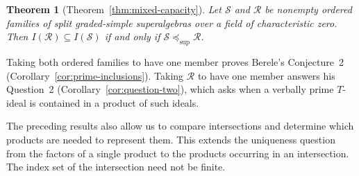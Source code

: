 \documentclass[11pt,reqno]{amsart}
\newtheorem{maintheorem}{Theorem}
\newcommand{\kk}{\Bbbk}
\newcommand{\E}{\mathcal E}
\newcommand{\Id}{\operatorname{Id}}
\newcommand{\Mat}{\operatorname{M}}
\newcommand{\Qtype}{\mathsf Q}
\theoremstyle{definition}
\theoremstyle{remark}
\numberwithin{equation}{section}
\begin{document}

\begin{maintheorem}[Theorem~\ref{thm:mixed-capacity}]
\label{main:products}
Let $\mathcal S$ and $\mathcal R$ be nonempty ordered families of split graded-simple superalgebras over a field of characteristic zero. Then
$
I(\mathcal R)\subseteq I(\mathcal S)$ if and only if
 $\mathcal S\preceq_{\mathrm{sup}}\mathcal R$.
\end{maintheorem}

Taking both ordered families to have one member proves
Berele's Conjecture~2
(Corollary~\ref{cor:prime-inclusions}).
Taking $\mathcal R$ to have one member answers his
Question~2 (Corollary~\ref{cor:question-two}), which asks when a verbally prime $T$-ideal
is contained in a product of such ideals.

The preceding results also allow us to compare intersections
and determine which products are needed to represent them.
This extends the uniqueness question from the factors of
a single product to the products occurring in an intersection.
The index set of the intersection need not be finite.
\end{document}
